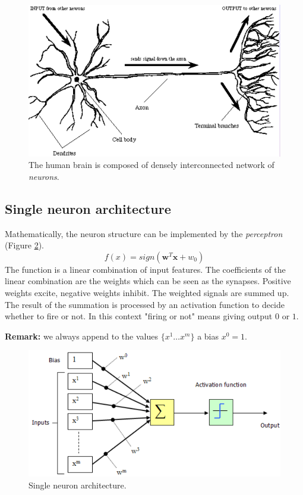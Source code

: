 \begin{figure}[H]
	\centering
	\includegraphics[scale=0.4]{
		images/12_LinearDiscriminantFunctions_brainNetwork.png
	}
	\caption{The human brain is composed of densely interconnected network of
	\textit{neurons}.}
	\label{fig:brainNetwork}
\end{figure}

\subsection{Single neuron architecture}
Mathematically, the neuron structure can be implemented by the \textit{perceptron}
(Figure \ref{fig:singleNeuronArchitecture}).
\begin{equation}
	\label{eq:SingleNeuronArchitecture}f(x) = \mathit{sign}(\pmb{w}^{T}\pmb{x}+ w_{0}
	)
\end{equation}
The function is a linear combination of input features. The coefficients of the linear
combination are the weights which can be seen as the synapses. Positive weights
excite, negative weights inhibit. The weighted signals are summed up. The result
of the summation is processed by an activation function to decide whether to fire
or not. In this context "firing or not" means giving output $0$ or $1$.
\newline

\textbf{Remark:} we always append to the values $\{x^{1}\hdots x^{m}\}$ a bias $x
^{0}= 1$.

\begin{figure}[H]
	\centering
	\includegraphics[scale=0.4]{
		images/12_LinearDiscriminantFunctions_singleNeuronArchitecture.png
	}
	\caption{Single neuron architecture.}
	\label{fig:singleNeuronArchitecture}
\end{figure}

